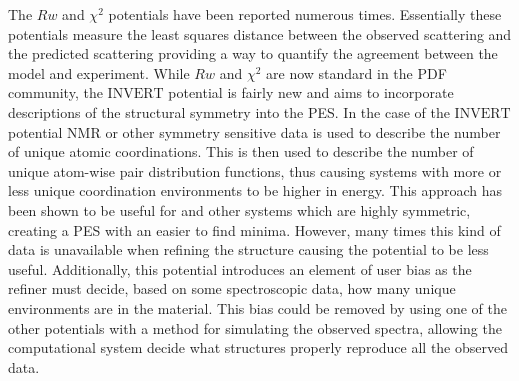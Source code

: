 The $Rw$ and $\chi^{2}$ potentials have been reported numerous times. \cite{Petkov2014, Masadeh2007, Choi2013, McGreevy, Proffen1997}
Essentially these potentials measure the least squares distance between the observed scattering and the predicted scattering providing a way to quantify the agreement between the model and experiment.
While $Rw$ and $\chi^{2}$ are now standard in the PDF community, the $\mathrm{INVERT}$ potential is fairly new and aims to incorporate descriptions of the structural symmetry into the PES. \cite{Cliffe2010, Cliffe2013}
In the case of the $\mathrm{INVERT}$ potential NMR or other symmetry sensitive data is used to describe the number of unique atomic coordinations.
This is then used to describe the number of unique atom-wise pair distribution functions, thus causing systems with more or less unique coordination environments to be higher in energy.
This approach has been shown to be useful for  and other systems which are highly symmetric, creating a PES with an easier to find minima. \cite{Cliffe2010, Cliffe2013}
However, many times this kind of data is unavailable when refining the structure causing the potential to be less useful.
Additionally, this potential introduces an element of user bias as the refiner must decide, based on some spectroscopic data, how many unique environments are in the material.
This bias could be removed by using one of the other potentials with a method for simulating the observed spectra, allowing the computational system decide what structures properly reproduce all the observed data.

